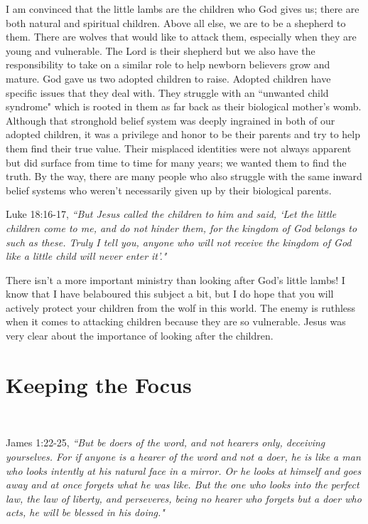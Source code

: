 \documentclass[oneside]{book}
\begin{document}
I am convinced that the little lambs are the children who God gives us; there are both natural and spiritual children. Above all else, we are to be a shepherd to them. There are wolves that would like to attack them, especially when they are young and vulnerable. The Lord is their shepherd but we also have the responsibility to take on a similar role to help newborn believers grow and mature. God gave us two adopted children to raise. Adopted children have specific issues that they deal with. They struggle with an ``unwanted child syndrome" which is rooted in them as far back as their biological mother's womb. Although that stronghold belief system was deeply ingrained in both of our adopted children, it was a privilege and honor to be their parents and try to help them find their true value. Their misplaced identities were not always apparent but did surface from time to time for many years; we wanted them to find the truth. By the way, there are many people who also struggle with the same inward belief systems who weren't necessarily given up by their biological parents.

Luke 18:16-17, \textit{``But Jesus called the children to him and said, `Let the little children come to me, and do not hinder them, for the kingdom of God belongs to such as these. Truly I tell you, anyone who will not receive the kingdom of God like a little child will never enter it'."}  

There isn't a more important ministry than looking after God's little lambs! I know that I have belaboured this subject a bit, but I do hope that you will actively protect your children from the wolf in this world. The enemy is ruthless when it comes to attacking children because they are so vulnerable. Jesus was very clear about the importance of looking after the children.


\chapter{Keeping the Focus}
\

James 1:22-25, \textit{``But be doers of the word, and not hearers only, deceiving yourselves. For if anyone is a hearer of the word and not a doer, he is like a man who looks intently at his natural face in a mirror. Or he looks at himself and goes away and at once forgets what he was like. But the one who looks into the perfect law, the law of liberty, and perseveres, being no hearer who forgets but a doer who acts, he will be blessed in his doing."}
\end{document}
